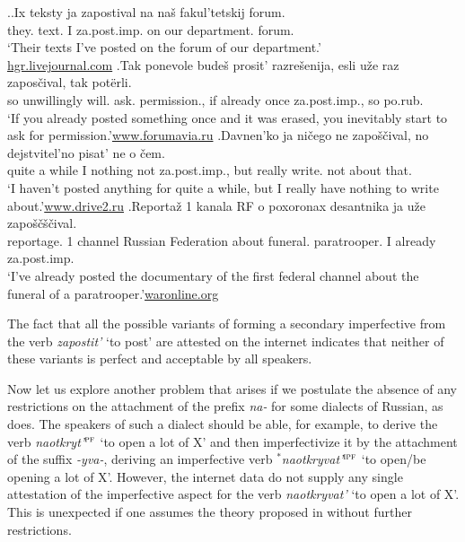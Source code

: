 \ex.\label{ex:zapostivat}\ag.Ix teksty ja zapostival na na\v{s} fakul'tetskij forum.\\
they. text. I za.post.imp. on our department. forum.\\
\trans `Their texts I've posted on the forum of our department.'\\\hbox{}\hfill\hbox{\url{hgr.livejournal.com}}
\bg.Tak ponevole bude\v{s} prosit' razre\v{s}enija, esli u\v{z}e raz zapos\v{c}ival, tak pot\"{e}rli.\\
so unwillingly will. ask. permission., if already once za.post.imp., so po.rub.\\
\trans `If you already posted something once and it was erased, you inevitably start to ask for permission.'\hbox{}\hfill\hbox{\url{www.forumavia.ru}}
\bg.Davnen'ko ja ni\v{c}ego ne zapo\v{s}\v{c}ival, no dejstvitel'no pisat' ne o \v{c}em.\\
{quite a while} I nothing not za.post.imp., but really write. not about that.\\
\trans `I haven't posted anything for quite a while, but I really have nothing to write about.'\hbox{}\hfill\hbox{\url{www.drive2.ru}}
\bg.Reporta\v{z} 1 kanala RF o poxoronax desantnika ja u\v{z}e zapo\v{s}\v{c}\v{s}\v{c}ival.\\
reportage. 1 channel {Russian Federation} about funeral. paratrooper. I already za.post.imp.\\
\trans `I've already posted the documentary of the first federal channel about the funeral of a paratrooper.'\hbox{}\hfill\hbox{\url{waronline.org}}

The fact that all the possible variants of forming a secondary imperfective from the verb \textit{zapostit'} `to post' are attested on the internet indicates that neither of these variants is perfect and acceptable by all speakers.

Now let us explore another problem that arises if we postulate the absence of any restrictions on the attachment of the prefix \textit{na-} for some dialects of Russian, as \citet{Tatevosov:13a} does. The speakers of such a dialect should be able, for example, to derive the verb \textit{naotkryt'}$^{\textsc{pf}}$ `to open a lot of X' and then imperfectivize it by the attachment of the suffix \textit{-yva-}, deriving an imperfective verb $^*$\textit{naotkryvat'}$^{\textsc{ipf}}$ `to open/be opening a lot of X'. However, the internet data do not supply any single attestation of the imperfective aspect for the verb \textit{naotkryvat'} `to open a lot of X'. This is unexpected if one assumes the theory proposed in \citet{Tatevosov:13a} without further restrictions.

